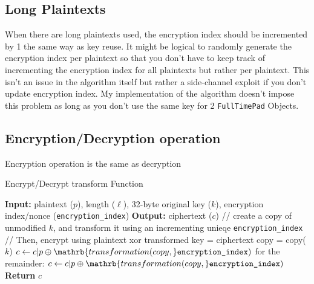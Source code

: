 \documentclass[fleqn, a4paper,12pt]{article}
\newcommand{\COMMENT}[1]{\State \textcolor[HTML]{003e57}{// #1}}
\begin{document}
\subsection {Long Plaintexts}

When there are long plaintexts used, the encryption index should be incremented by 1 the same way as key reuse. It might be logical to randomly generate the encryption index per plaintext so that you don't have to keep track of incrementing the encryption index for all plaintexts but rather per plaintext. This isn't an issue in the algorithm itself but rather a side-channel exploit if you don't update encryption index. My implementation of the algorithm doesn't impose this problem as long as you don't use the same key for 2 \texttt{FullTimePad} Objects.

\subsection {Encryption/Decryption operation}

Encryption operation is the same as decryption

\begin{algorithm}[H] %
\caption{Encrypt/Decrypt transform Function}
\begin{algorithmic}[1]  %
\State \textbf{Input:} plaintext ($p$), length ($\ell$), 32-byte original key ($k$), encryption index/nonce (\texttt{encryption\_index})
\State \textbf{Output:} ciphertext ($c$)
	\COMMENT{create a copy of unmodified $k$, and transform it using an incrementing unieqe \texttt{encryption\_index}}
	\COMMENT{Then, encrypt using plaintext xor transformed key = ciphertext}
	\State copy = copy($k$)
	\State $c \gets c | p \oplus \mathrb{transformation(copy,} \texttt{encryption\_index})$
\EndFor
\State for the remainder:
\State $c \gets c | p \oplus \mathrb{transformation(copy,} \texttt{encryption\_index})$
\State \textbf{Return} $c$
\end{algorithmic}
\end{algorithm}
\end{document}
